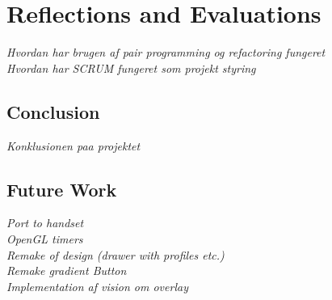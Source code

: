 \chapter{Reflections and Evaluations}
\textit{Hvordan har brugen af pair programming og refactoring fungeret\\
Hvordan har SCRUM fungeret som projekt styring\\
}
\section{Conclusion}
\textit{Konklusionen paa projektet}

\section{Future Work}
\textit{Port to handset\\
OpenGL timers\\
Remake of design (drawer with profiles etc.)\\
Remake gradient Button\\
Implementation af vision om overlay\\}
